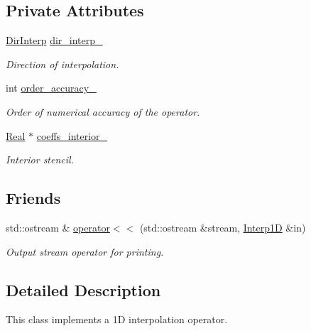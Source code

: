 \subsection*{Private Attributes}
\begin{DoxyCompactItemize}
\item 
\hyperlink{group__c02-enums_ga674ec67bd1baa04e5dc06c2bcc351972}{Dir\+Interp} \hyperlink{classmtk_1_1Interp1D_a854e2c72f07c9fca4bbe32bfad2e0792}{dir\+\_\+interp\+\_\+}
\begin{DoxyCompactList}\small\item\em Direction of interpolation. \end{DoxyCompactList}\item 
int \hyperlink{classmtk_1_1Interp1D_a1ee8467d93536dc04240cd76f0d95c9c}{order\+\_\+accuracy\+\_\+}
\begin{DoxyCompactList}\small\item\em Order of numerical accuracy of the operator. \end{DoxyCompactList}\item 
\hyperlink{group__c01-roots_gac080bbbf5cbb5502c9f00405f894857d}{Real} $\ast$ \hyperlink{classmtk_1_1Interp1D_abae01ab84103d8b11903357cfdeb94d5}{coeffs\+\_\+interior\+\_\+}
\begin{DoxyCompactList}\small\item\em Interior stencil. \end{DoxyCompactList}\end{DoxyCompactItemize}
\subsection*{Friends}
\begin{DoxyCompactItemize}
\item 
std\+::ostream \& \hyperlink{classmtk_1_1Interp1D_a6e54e703f239df8e5db192638ac86686}{operator$<$$<$} (std\+::ostream \&stream, \hyperlink{classmtk_1_1Interp1D}{Interp1\+D} \&in)
\begin{DoxyCompactList}\small\item\em Output stream operator for printing. \end{DoxyCompactList}\end{DoxyCompactItemize}


\subsection{Detailed Description}
This class implements a 1\+D interpolation operator. 

